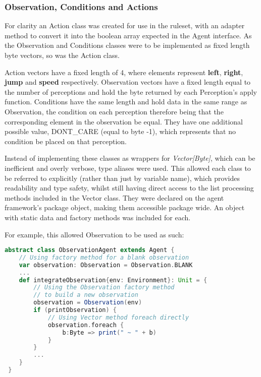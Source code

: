 \subsubsection{Observation, Conditions and Actions}

For clarity an Action class was created for use in the ruleset, with an adapter method to convert it into the boolean array expected in the Agent interface. As the Observation and Conditions classes were to be implemented as fixed length byte vectors, so was the Action class.

Action vectors have a fixed length of 4, where elements represent \textbf{left}, \textbf{right}, \textbf{jump} and \textbf{speed} respectively. Observation vectors have a fixed length equal to the number of perceptions and hold the byte returned by each Perception's apply function. Conditions have the same length and hold data in the same range as Observation, the condition on each perception therefore being that the corresponding element in the observation be equal. They have one additional possible value, {\footnotesize DONT\_CARE} (equal to byte -1), which represents that no condition be placed on that perception.

Instead of implementing these classes as wrappers for \emph{Vector[Byte]}, which can be inefficient and overly verbose, type aliases were used. This allowed each class to be referred to explicitly (rather than just by variable name), which provides readability and type safety, whilst still having direct access to the list processing methods included in the Vector class. They were declared on the agent framework's package object, making them accessible package wide. An object with static data and factory methods was included for each.

For example, this allowed Observation to be used as such:

\begin{minipage}{0.9\linewidth}
\centering
\begin{lstlisting}[language=scala]
abstract class ObservationAgent extends Agent {
    // Using factory method for a blank observation
    var observation: Observation = Observation.BLANK
    ...
    def integrateObservation{env: Environment}: Unit = {
        // Using the Observation factory method 
        // to build a new observation
        observation = Observation(env)
        if (printObservation) {
            // Using Vector method foreach directly
            observation.foreach { 
                b:Byte => print(" ~ " + b)
            }
        }
        ...
    }
 }

\end{lstlisting}
\end{minipage}



